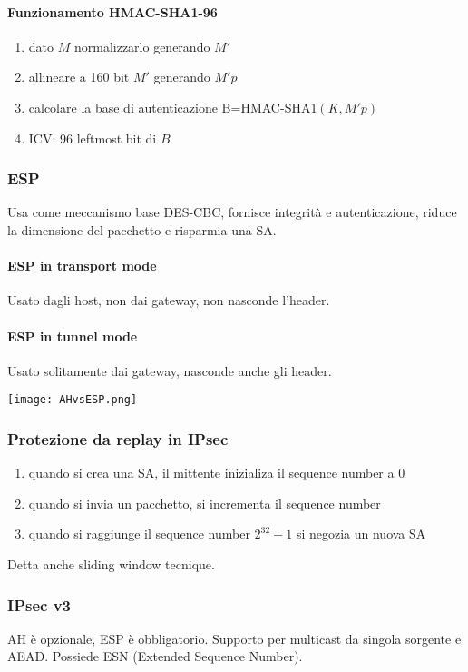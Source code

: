 \documentclass[11pt]{article}
\begin{document}
\paragraph*{Funzionamento HMAC-SHA1-96}
\begin{enumerate}
    \item dato $M$ normalizzarlo generando $M'$
    \item allineare a 160 bit $M'$ generando $M'p$
    \item calcolare la base di autenticazione B=HMAC-SHA1$(K,M'p)$
    \item ICV: 96 leftmost bit di $B$
\end{enumerate}
\subsubsection{ESP}
Usa come meccanismo base DES-CBC, fornisce integrità e autenticazione, riduce la dimensione del pacchetto e risparmia una 
SA.
\paragraph*{ESP in transport mode}
Usato dagli host, non dai gateway, non nasconde l'header.
\paragraph*{ESP in tunnel mode}
Usato solitamente dai gateway, nasconde anche gli header.
\begin{center}
    \texttt{[image: AHvsESP.png]}
\end{center}
\subsubsection{Protezione da replay in IPsec}
\begin{enumerate}
    \item quando si crea una SA, il mittente inizializa il sequence number a 0
    \item quando si invia un pacchetto, si incrementa il sequence number 
    \item quando si raggiunge il sequence number $2^{32}-1$ si negozia un nuova SA
\end{enumerate}
Detta anche sliding window tecnique.
\subsubsection{IPsec v3}
AH è opzionale, ESP è obbligatorio. Supporto per multicast da singola sorgente e AEAD. Possiede ESN (Extended Sequence Number).
\end{document}
